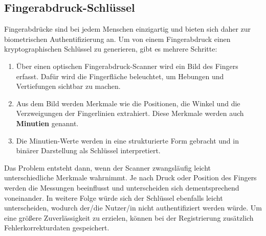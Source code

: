 \documentclass{article}
\begin{document}
    \subsection{Fingerabdruck-Schlüssel}
    Fingerabdrücke sind bei jedem Menschen einzigartig und bieten sich daher zur biometrischen Authentifizierung an.
    Um von einem Fingerabdruck einen kryptographischen Schlüssel zu generieren, gibt es mehrere Schritte:
    \begin{enumerate}
        \item Über einen optischen Fingerabdruck-Scanner wird ein Bild des Fingers erfasst. Dafür wird
        die Fingerfläche beleuchtet, um Hebungen und Vertiefungen sichtbar zu machen.
        \item Aus dem Bild werden Merkmale wie die Positionen, die Winkel und die Verzweigungen der Fingerlinien extrahiert.
        Diese Merkmale werden auch \textbf{Minutien} genannt.
        \item Die Minutien-Werte werden in eine strukturierte Form gebracht und in binärer Darstellung als Schlüssel interpretiert.
    \end{enumerate}
    Das Problem entsteht dann, wenn der Scanner zwangsläufig leicht unterschiedliche Merkmale wahrnimmt. Je nach 
    Druck oder Position des Fingers werden die Messungen beeinflusst und unterscheiden sich dementsprechend voneinander.
    In weitere Folge würde sich der Schlüssel ebenfalls leicht unterscheiden, wodurch der/die Nutzer/in nicht
    authentifiziert werden würde. Um eine größere Zuverlässigkeit zu erzielen, können bei der Registrierung 
    zusätzlich Fehlerkorrekturdaten gespeichert.
\end{document}

